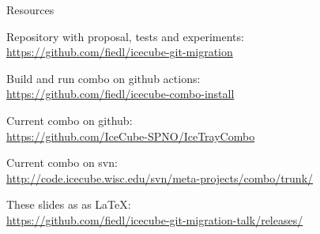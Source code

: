 
\begin{frame}{Resources}
  \begin{center}

    Repository with proposal, tests and experiments: \\
    \url{https://github.com/fiedl/icecube-git-migration}

    \vspace{1em}


    \vspace{1em}

    Build and run combo on github actions: \\
    \url{https://github.com/fiedl/icecube-combo-install}

    \vspace{1em}

    Current combo on github: \\
    \url{https://github.com/IceCube-SPNO/IceTrayCombo}

    \vspace{1em}

    Current combo on svn: \\
    \url{http://code.icecube.wisc.edu/svn/meta-projects/combo/trunk/}

    \vspace{1em}

    These slides as as \LaTeX: \\
    \url{https://github.com/fiedl/icecube-git-migration-talk/releases/}

  \end{center}
\end{frame}